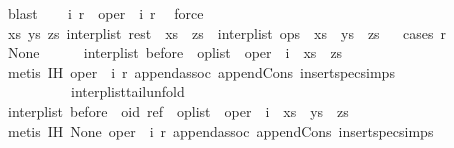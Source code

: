 \begin{isabellebody}
\ blast\isanewline
\ \ \isamarkupfalse%
\ i{}\ r{}\ \ {\isachardoublequoteopen}oper\ {\isacharequal}\ {\isacharparenleft}i{}{\isacharcomma}\ r{}{\isacharparenright}{\isachardoublequoteclose}\ \isamarkupfalse%
\ force\isanewline
\ \ \isamarkupfalse%
\ \isamarkupfalse%
\ {\isachardoublequoteopen}{\isasymexists}xs\ ys\ zs{\isachardot}\ interp{\isacharunderscore}list\ rest\ {\isacharequal}\ xs\ {\isacharat}\ zs\ {\isasymand}\ interp{\isacharunderscore}list\ ops\ {\isacharequal}\ xs\ {\isacharat}\ ys\ {\isacharat}\ zs{\isachardoublequoteclose}\isanewline
\ \ \isamarkupfalse%
{\isacharparenleft}cases\ r{}{\isacharparenright}\isanewline
\ \ \ \ \isamarkupfalse%
\ None\isanewline
\ \ \ \ \isamarkupfalse%
\ {\isachardoublequoteopen}interp{\isacharunderscore}list\ {\isacharparenleft}before\ {\isacharat}\ op{\isacharunderscore}list\ {\isacharat}\ {\isacharbrackleft}oper{\isacharbrackright}{\isacharparenright}\ {\isacharequal}\ {\isacharparenleft}i{}\ {\isacharhash}\ xs{\isacharparenright}\ {\isacharat}\ zs{\isachardoublequoteclose}\isanewline
\ \ \ \ \ \ \isamarkupfalse%
\ {\isacharparenleft}metis\ IH{}\ {\isacartoucheopen}oper\ {\isacharequal}\ {\isacharparenleft}i{}{\isacharcomma}\ r{}{\isacharparenright}{\isacartoucheclose}\ append{\isachardot}assoc\ append{\isacharunderscore}Cons\ insert{\isacharunderscore}spec{\isachardot}simps{\isacharparenleft}{}{\isacharparenright}\isanewline
\ \ \ \ \ \ \ \ \ \ interp{\isacharunderscore}list{\isacharunderscore}tail{\isacharunderscore}unfold{\isacharparenright}\isanewline
\ \ \ \ \isamarkupfalse%
\ \isamarkupfalse%
\ {\isachardoublequoteopen}interp{\isacharunderscore}list\ {\isacharparenleft}before\ {\isacharat}\ {\isacharparenleft}oid{\isacharcomma}\ ref{\isacharparenright}\ {\isacharhash}\ op{\isacharunderscore}list\ {\isacharat}\ {\isacharbrackleft}oper{\isacharbrackright}{\isacharparenright}\ {\isacharequal}\ {\isacharparenleft}i{}\ {\isacharhash}\ xs{\isacharparenright}\ {\isacharat}\ ys\ {\isacharat}\ zs{\isachardoublequoteclose}\isanewline
\ \ \ \ \ \ \isamarkupfalse%
\ {\isacharparenleft}metis\ IH{}\ None\ {\isacartoucheopen}oper\ {\isacharequal}\ {\isacharparenleft}i{}{\isacharcomma}\ r{}{\isacharparenright}{\isacartoucheclose}\ append{\isachardot}assoc\ append{\isacharunderscore}Cons\ insert{\isacharunderscore}spec{\isachardot}simps{\isacharparenleft}{}{\isacharparenright}\isanewline

\end{isabellebody}
